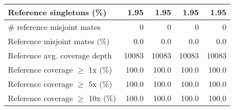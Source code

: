 \documentclass[12pt,a4paper]{article}
\begin{document}
\begin{table}[ht]
\begin{center}
\begin{tabular}{|l*{4}{|r}|}
Reference singletons (\%) & 1.95 & 1.95 & 1.95 & 1.95 \\ \hline
\# reference misjoint mates & 0 & 0 & 0 & 0 \\ \hline
Reference misjoint mates (\%) & 0.0 & 0.0 & 0.0 & 0.0 \\ \hline
Reference avg. coverage depth & 10083 & 10083 & 10083 & 10083 \\ \hline
Reference coverage $\geq$ 1x (\%) & 100.0 & 100.0 & 100.0 & 100.0 \\ \hline
Reference coverage $\geq$ 5x (\%) & 100.0 & 100.0 & 100.0 & 100.0 \\ \hline
Reference coverage $\geq$ 10x (\%) & 100.0 & 100.0 & 100.0 & 100.0 \\ \hline
\end{tabular}
\end{center}
\end{table}
\end{document}
